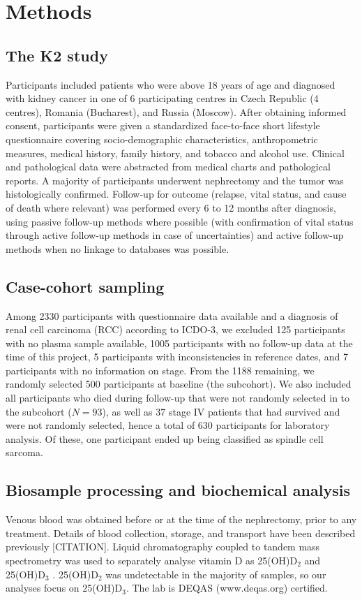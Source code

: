 \documentclass[a4paper,11pt]{article}
\begin{document}
\section*{Methods}
\subsection*{The K2 study}
Participants included patients who were above 18 years of age and diagnosed 
with kidney cancer in one of 6 participating centres in Czech Republic (4 
centres), Romania (Bucharest), and Russia (Moscow). After obtaining informed 
consent, participants were given a standardized face-to-face short lifestyle 
questionnaire covering socio-demographic characteristics, anthropometric 
measures, medical history, family history, and tobacco and alcohol use. 
Clinical and pathological data were abstracted from medical charts and 
pathological reports. A majority of participants underwent nephrectomy and the 
tumor was histologically confirmed. Follow-up for outcome (relapse, vital 
status, and cause of death where relevant) was performed every 6 to 12 months 
after diagnosis, using passive follow-up methods where possible (with 
confirmation of vital status through active follow-up methods in case of 
uncertainties) and active follow-up methods when no linkage to databases was 
possible.

\subsection*{Case-cohort sampling}
Among 2330 participants with questionnaire data available and a diagnosis of 
renal cell carcinoma (RCC) according to ICDO-3, we excluded 125 participants 
with no plasma sample available, 1005 participants with no follow-up data at 
the time of this project, 5 participants with inconsistencies in reference 
dates, and 7 participants with no information on stage. From the 1188 
remaining, we randomly selected 500 participants at baseline (the subcohort). 
We also included all participants who died during follow-up that were not 
randomly selected in to the subcohort ($N=93$), as well as 37 stage IV patients 
that had survived and were not randomly selected, hence a total of 
630 participants for laboratory analysis. Of these, one participant ended up 
being classified as spindle cell sarcoma.

\subsection*{Biosample processing and biochemical analysis}
Venous blood was obtained before or at the time of the nephrectomy, prior to 
any treatment. Details of blood collection, storage, and transport have 
been described previously [CITATION]. Liquid chromatography coupled to tandem 
mass spectrometry was used to separately analyse vitamin D as 25(OH)D$_2$ and 
25(OH)D$_3$ \cite{midttun_determination_2011}. 25(OH)D$_2$ was undetectable in 
the majority of samples, so our analyses focus on 25(OH)D$_3$. The lab is DEQAS 
(www.deqas.org) certified.
\end{document}
